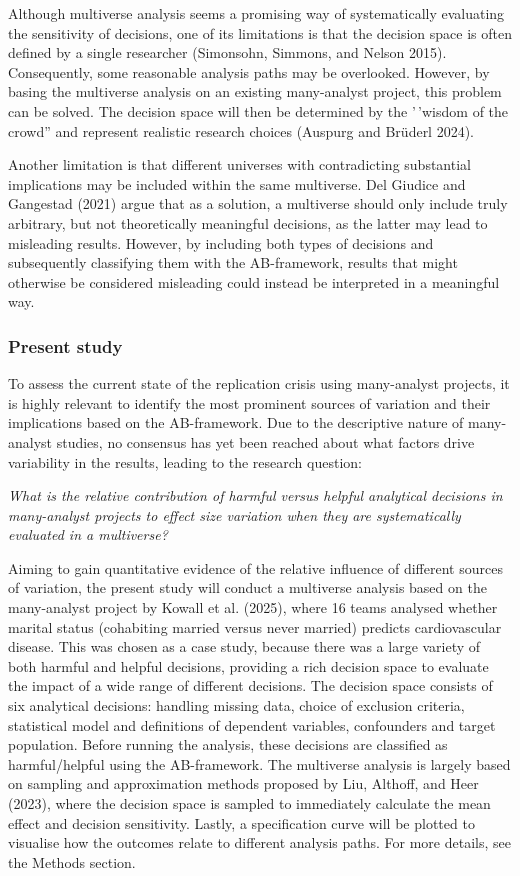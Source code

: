 \documentclass[
  letterpaper,
  DIV=11,
  numbers=noendperiod]{scrartcl}
\begin{document}
Although multiverse analysis seems a promising way of systematically
evaluating the sensitivity of decisions, one of its limitations is that
the decision space is often defined by a single researcher (Simonsohn,
Simmons, and Nelson 2015). Consequently, some reasonable analysis paths
may be overlooked. However, by basing the multiverse analysis on an
existing many-analyst project, this problem can be solved. The decision
space will then be determined by the '\,'wisdom of the crowd'' and
represent realistic research choices (Auspurg and Brüderl 2024).

Another limitation is that different universes with contradicting
substantial implications may be included within the same multiverse. Del
Giudice and Gangestad (2021) argue that as a solution, a multiverse
should only include truly arbitrary, but not theoretically meaningful
decisions, as the latter may lead to misleading results. However, by
including both types of decisions and subsequently classifying them with
the AB-framework, results that might otherwise be considered misleading
could instead be interpreted in a meaningful way.

\subsubsection{Present study}\label{present-study}

To assess the current state of the replication crisis using many-analyst
projects, it is highly relevant to identify the most prominent sources
of variation and their implications based on the AB-framework. Due to
the descriptive nature of many-analyst studies, no consensus has yet
been reached about what factors drive variability in the results,
leading to the research question:

\emph{What is the relative contribution of harmful versus helpful
analytical decisions in many-analyst projects to effect size variation
when they are systematically evaluated in a multiverse?}

Aiming to gain quantitative evidence of the relative influence of
different sources of variation, the present study will conduct a
multiverse analysis based on the many-analyst project by Kowall et al.
(2025), where 16 teams analysed whether marital status (cohabiting
married versus never married) predicts cardiovascular disease. This was
chosen as a case study, because there was a large variety of both
harmful and helpful decisions, providing a rich decision space to
evaluate the impact of a wide range of different decisions. The decision
space consists of six analytical decisions: handling missing data,
choice of exclusion criteria, statistical model and definitions of
dependent variables, confounders and target population. Before running
the analysis, these decisions are classified as harmful/helpful using
the AB-framework. The multiverse analysis is largely based on sampling
and approximation methods proposed by Liu, Althoff, and Heer (2023),
where the decision space is sampled to immediately calculate the mean
effect and decision sensitivity. Lastly, a specification curve will be
plotted to visualise how the outcomes relate to different analysis
paths. For more details, see the Methods section.
\end{document}
